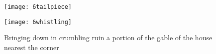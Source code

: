 \begin{figure}[b!]
\centering
\texttt{[image: 6tailpiece]}
\end{figure}
\clearpage

\begin{figure}[p]
\centering
\texttt{[image: 6whistling]}
\caption[Bringing down in crumbling ruin the house nearest the corner]{Bringing down in crumbling ruin a portion of the gable of the house nearest the corner}
\end{figure}
